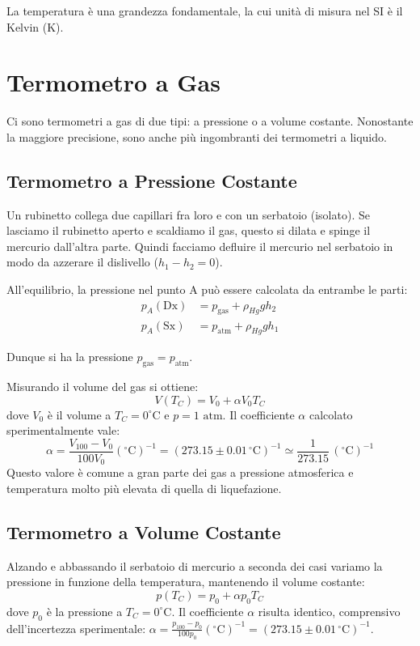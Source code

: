 La temperatura è una grandezza fondamentale, la cui unità di misura nel SI è il Kelvin (K).

\section{Termometro a Gas}
Ci sono termometri a gas di due tipi: a pressione o a volume costante. Nonostante la maggiore precisione, sono anche più ingombranti dei termometri a liquido.

\subsection{Termometro a Pressione Costante}
Un rubinetto collega due capillari fra loro e con un serbatoio (isolato). Se lasciamo il rubinetto aperto e scaldiamo il gas, questo si dilata e spinge il mercurio dall'altra parte.
Quindi facciamo defluire il mercurio nel serbatoio in modo da azzerare il dislivello ($h_1 - h_2 = 0$).

All'equilibrio, la pressione nel punto A può essere calcolata da entrambe le parti:
\begin{align*}
p_A(\text{Dx}) &= p_{\text{gas}} + \rho_{Hg} g h_2 \\
p_A(\text{Sx}) &= p_{\text{atm}} + \rho_{Hg} g h_1
\end{align*}

Dunque si ha la pressione $p_{\text{gas}} = p_{\text{atm}}$.

Misurando il volume del gas si ottiene:
\begin{equation}
    \boxed{V(T_C) = V_0 + \alpha V_0 T_C}
\end{equation}
dove $V_0$ è il volume a $T_C=0^\circ\text{C}$ e $p=1\text{ atm}$.
Il coefficiente $\alpha$ calcolato sperimentalmente vale:
\begin{equation}
    \alpha = \frac{V_{100} - V_0}{100 V_0} (^\circ\text{C})^{-1} = \boxed{ \left( 273.15 \pm 0.01 \, ^\circ\text{C} \right)^{-1} \simeq \frac{1}{273.15} \, (^\circ\text{C})^{-1} }
\end{equation}
Questo valore è comune a gran parte dei gas a pressione atmosferica e temperatura molto più elevata di quella di liquefazione.

\subsection{Termometro a Volume Costante}
Alzando e abbassando il serbatoio di mercurio a seconda dei casi variamo la pressione in funzione della temperatura, mantenendo il volume costante:
\begin{equation}
    \boxed{p(T_C) = p_0 + \alpha p_0 T_C}
\end{equation}
dove $p_0$ è la pressione a $T_C=0^\circ\text{C}$. Il coefficiente $\alpha$ risulta identico, comprensivo dell'incertezza sperimentale: $\alpha = \frac{p_{100} - p_0}{100 p_0} (^\circ\text{C})^{-1} = \boxed{ \left( 273.15 \pm 0.01 \, ^\circ\text{C} \right)^{-1} }$.

